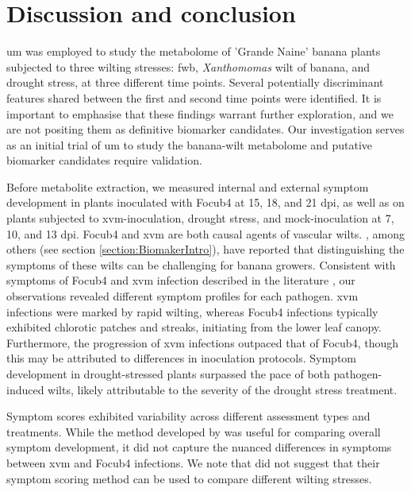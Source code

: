 \newpage
\section{Discussion and conclusion}

\Acf{um} was employed to study the metabolome of 'Grande Naine' banana plants subjected to three wilting stresses: \acl{fwb}, \textit{Xanthomomas} wilt of banana, and drought stress, at three different time points. Several potentially discriminant features shared between the first and second time points were identified. It is important to emphasise that these findings warrant further exploration, and we are not positing them as definitive biomarker candidates. Our investigation serves as an initial trial of \ac{um} to study the banana-wilt metabolome and putative biomarker candidates require validation. 

Before metabolite extraction, we measured internal and external symptom development in plants inoculated with \ac{Focub4} at 15, 18, and 21 \ac{dpi}, as well as on plants subjected to \ac{xvm}-inoculation, drought stress, and mock-inoculation at 7, 10, and 13 \ac{dpi}. \ac{Focub4} and \ac{xvm} are both causal agents of vascular wilts. \textcite{Biruma2007}, among others (see section \ref{section:BiomakerIntro}), have reported that distinguishing the symptoms of these wilts can be challenging for banana growers. Consistent with symptoms of \ac{Focub4} and \ac{xvm} infection described in the literature \parencite{Ploetz2015a, Garcia-Bastidas2019, Ordonez2015a, Ocimati2022, Tripathi2021}, our observations revealed different symptom profiles for each pathogen. \ac{xvm} infections were marked by rapid wilting, whereas \ac{Focub4} infections typically exhibited chlorotic patches and streaks, initiating from the lower leaf canopy. Furthermore, the progression of \ac{xvm} infections outpaced that of \ac{Focub4}, though this may be attributed to differences in inoculation protocols. Symptom development in drought-stressed plants surpassed the pace of both pathogen-induced wilts, likely attributable to the severity of the drought stress treatment.  

Symptom scores exhibited variability across different assessment types and treatments. While the method developed by \textcite{Garcia-Bastidas2019} was useful for comparing overall symptom development, it did not capture the nuanced differences in symptoms between \ac{xvm} and \ac{Focub4} infections. We note that \textcite{Garcia-Bastidas2019} did not suggest that their symptom scoring method can be used to compare different wilting stresses.

